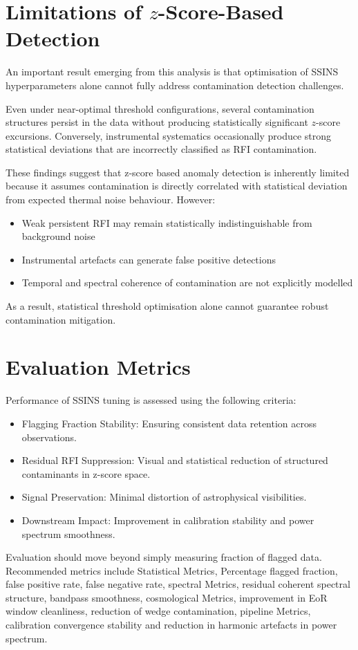 \documentclass{article}
\begin{document}
\section{Limitations of $z$-Score-Based Detection}
An important result emerging from this analysis is that optimisation of SSINS hyperparameters alone cannot fully address contamination detection challenges.

Even under near-optimal threshold configurations, several contamination structures persist in the data without producing statistically significant $z$-score excursions. Conversely, instrumental systematics occasionally produce strong statistical deviations that are incorrectly classified as RFI contamination.

These findings suggest that z-score based anomaly detection is inherently limited because it assumes contamination is directly correlated with statistical deviation from expected thermal noise behaviour. However:
\begin{itemize}
\item Weak persistent RFI may remain statistically indistinguishable from background noise
\item Instrumental artefacts can generate false positive detections
\item Temporal and spectral coherence of contamination are not explicitly modelled
\end{itemize}
As a result, statistical threshold optimisation alone cannot guarantee robust contamination mitigation.

\section{Evaluation Metrics}
Performance of SSINS tuning is assessed using the following criteria:
\begin{itemize}
\item Flagging Fraction Stability: Ensuring consistent data retention across observations.
\item Residual RFI Suppression: Visual and statistical reduction of structured contaminants in z-score space.
\item Signal Preservation: Minimal distortion of astrophysical visibilities.
\item Downstream Impact: Improvement in calibration stability and power spectrum smoothness.
\end{itemize}
Evaluation should move beyond simply measuring fraction of flagged data. Recommended metrics include Statistical Metrics, Percentage flagged fraction, false positive rate, false negative rate, spectral Metrics, residual coherent spectral structure, bandpass smoothness, cosmological Metrics, improvement in EoR window cleanliness, reduction of wedge contamination, pipeline Metrics, calibration convergence stability and reduction in harmonic artefacts in power spectrum.
\end{document}
